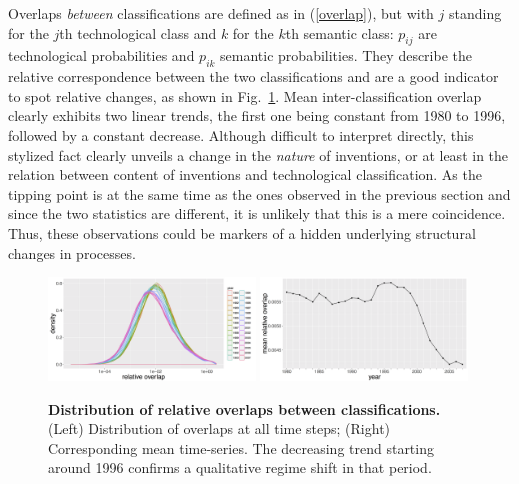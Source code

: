 \documentclass[12pt,twoside,a4paper]{article}
\begin{document}
Overlaps \emph{between} classifications are defined as in (\ref{overlap}), but with $j$ standing for the $j$th technological class and $k$ for the $k$th semantic class: $p_{ij}$ are technological probabilities and $p_{ik}$ semantic probabilities. They describe the relative correspondence between the two classifications and are a good indicator to spot relative changes, as shown in Fig.~\ref{fig:inter-classif-overlap}. Mean inter-classification overlap clearly exhibits two linear trends, the first one being constant from 1980 to 1996, followed by a constant decrease. Although difficult to interpret directly, this stylized fact clearly unveils a change in the \emph{nature} of inventions, or at least in the relation between content of inventions and technological classification. As the tipping point is at the same time as the ones observed in the previous section and since the two statistics are different, it is unlikely that this is a mere coincidence. Thus, these observations could be markers of a hidden underlying structural changes in processes. 




\begin{figure}[!ht]
\includegraphics[width=0.49\textwidth]{relative_interclassif_all_density_semcounts.png}
\includegraphics[width=0.49\textwidth]{relative_interclassif_all_ts_semcounts.png}
\caption{\textbf{Distribution of relative overlaps between classifications.} (Left) Distribution of overlaps at all time steps; (Right) Corresponding mean time-series. The decreasing trend starting around 1996 confirms a qualitative regime shift in that period.}
\label{fig:inter-classif-overlap}
\end{figure}
\end{document}
